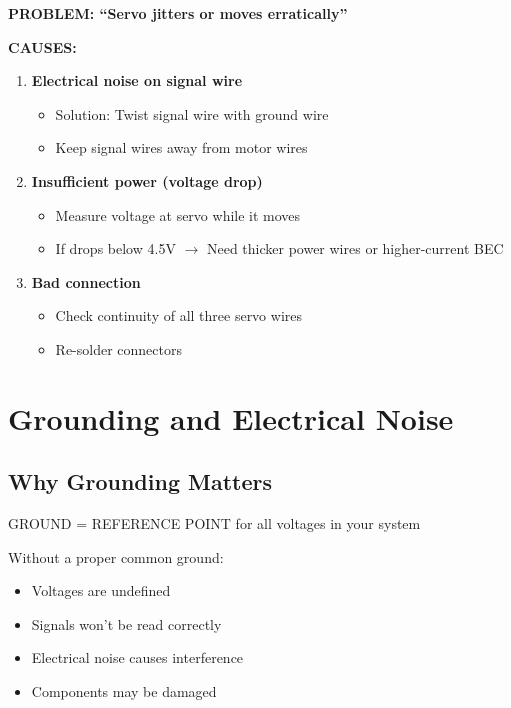 \documentclass[11pt,letterpaper]{article}
\begin{document}
\vspace{1em}

\textbf{PROBLEM: ``Servo jitters or moves erratically''}

\textbf{CAUSES:}
\begin{enumerate}
\item \textbf{Electrical noise on signal wire}
\begin{itemize}[nosep]
\item Solution: Twist signal wire with ground wire
\item Keep signal wires away from motor wires
\end{itemize}

\item \textbf{Insufficient power (voltage drop)}
\begin{itemize}[nosep]
\item Measure voltage at servo while it moves
\item If drops below 4.5V $\rightarrow$ Need thicker power wires or higher-current BEC
\end{itemize}

\item \textbf{Bad connection}
\begin{itemize}[nosep]
\item Check continuity of all three servo wires
\item Re-solder connectors
\end{itemize}
\end{enumerate}

\newpage
\section{Grounding and Electrical Noise}

\subsection{Why Grounding Matters}

GROUND = REFERENCE POINT for all voltages in your system

Without a proper common ground:
\begin{itemize}
\item Voltages are undefined
\item Signals won't be read correctly
\item Electrical noise causes interference
\item Components may be damaged
\end{itemize}
\end{document}
